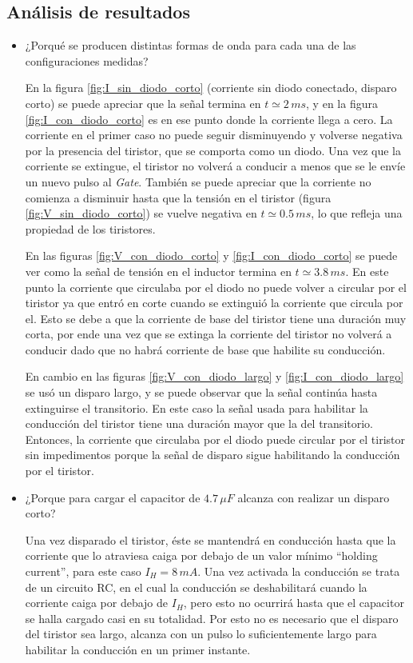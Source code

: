 \documentclass[10pt,spanish,a4paper,openany,notitlepage]{article}
\begin{document}
\subsection{Análisis de resultados}

\begin{itemize}

\item ¿Porqué se producen distintas formas de onda para cada una de las 
configuraciones medidas?

En la figura \ref{fig:I_sin_diodo_corto} (corriente sin diodo conectado, disparo corto)
se puede  apreciar que la señal termina en $t\simeq 2\,\unit{ms}$, y en la figura 
\ref{fig:I_con_diodo_corto} es en ese punto donde la corriente llega a cero. 
La corriente en el primer caso no puede seguir disminuyendo y volverse 
negativa por la presencia del tiristor, que se comporta como un diodo. 
Una vez que la corriente se extingue, el tiristor no volverá a conducir 
a menos que se le envíe un nuevo pulso al \emph{Gate}.
También se puede apreciar que la corriente no comienza a disminuir hasta que la 
tensión en el tiristor (figura \ref{fig:V_sin_diodo_corto}) se vuelve 
negativa en $t\simeq 0.5\,\unit{ms}$, lo que refleja una propiedad de los tiristores.

En las figuras \ref{fig:V_con_diodo_corto} y \ref{fig:I_con_diodo_corto} 
se puede ver como la señal de tensión en el inductor termina en 
$t\simeq 3.8\,\unit{ms}$. En este punto la corriente que 
circulaba por el diodo no puede volver a circular por el tiristor ya que 
entró en corte cuando se extinguió la corriente que circula por el. 
Esto se debe a que la corriente de base del 
tiristor tiene una duración muy corta, por ende una vez que se 
extinga la corriente del tiristor no volverá a conducir dado que no 
habrá corriente de base que habilite su conducción. 

En cambio en las figuras \ref{fig:V_con_diodo_largo} y \ref{fig:I_con_diodo_largo} se usó 
un disparo largo, y se puede observar que la señal continúa hasta 
extinguirse el transitorio. En este caso la señal usada para habilitar 
la conducción del tiristor tiene una duración mayor que la del transitorio. 
Entonces, la corriente que circulaba por el diodo puede circular 
por el tiristor sin impedimentos porque la señal 
de disparo sigue habilitando la conducción por el tiristor.


\item ¿Porque para cargar el capacitor de $4.7\,\unit{\mu F}$ alcanza con 
realizar un disparo corto?

Una vez disparado el tiristor, éste se mantendrá en conducción hasta 
que la corriente que lo atraviesa caiga por debajo de un valor mínimo 
“holding current”, para este caso $I_H=8\,\unit{mA}$. Una vez activada 
la conducción se trata de un circuito RC, en el cual la conducción se 
deshabilitará cuando la corriente caiga por debajo de $I_H$, pero esto 
no ocurrirá hasta que el capacitor se halla cargado casi en su totalidad. 
Por esto no es necesario que el disparo del tiristor sea largo, alcanza 
con un pulso lo suficientemente largo para habilitar la conducción en 
un primer instante.

\end{itemize}
\end{document}
